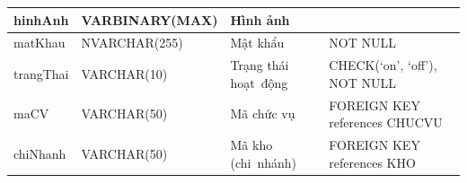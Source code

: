 \documentclass[a4paper,12pt]{report}
\begin{document}
\begin{center}
\begin{longtable}{|>{\centering\arraybackslash}p{2.7cm}|
        >{\centering\arraybackslash}p{4.5cm}|
        >{\centering\arraybackslash}p{3.8cm}|
        >{\centering\arraybackslash}p{4cm}|}
        \hline
        hinhAnh & VARBINARY(MAX) & Hình ảnh & \\                                                                                                                          
        \hline
        matKhau & NVARCHAR(255) & Mật khẩu & NOT NULL \\                                                                                                                          
        \hline
        trangThai &  VARCHAR(10)  & Trạng thái hoạt~động & CHECK(‘on’, ‘off’), NOT NULL \\
        \hline
        maCV & VARCHAR(50) & Mã chức vụ & FOREIGN KEY references CHUCVU \\                                                                                                                          
        \hline
        chiNhanh & VARCHAR(50) & Mã kho (chi~nhánh) & FOREIGN KEY references KHO \\                                                                                                                          
        \hline
    \end{longtable}
\end{center}
\end{document}
